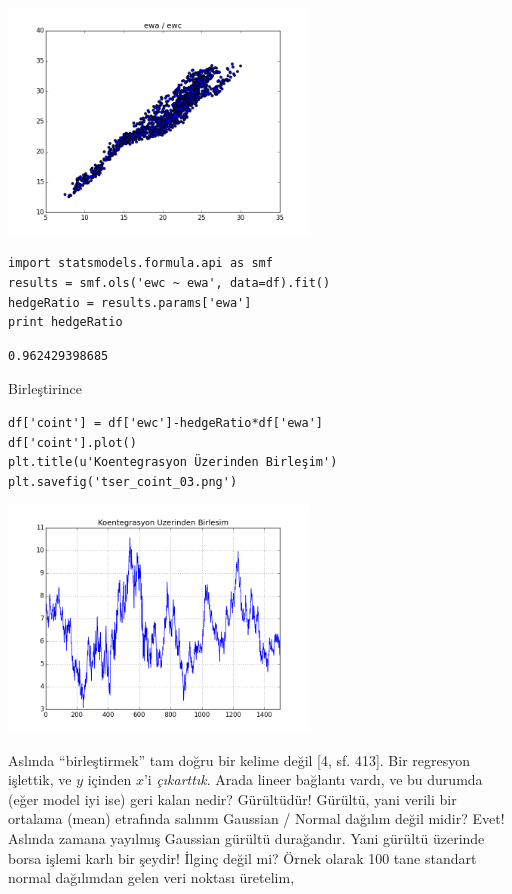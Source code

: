 \documentclass[12pt,fleqn]{article}\usepackage{../../common}
\begin{document}
\includegraphics[height=6cm]{tser_coint_02.png}

\begin{verbatim}
import statsmodels.formula.api as smf
results = smf.ols('ewc ~ ewa', data=df).fit()
hedgeRatio = results.params['ewa']
print hedgeRatio
\end{verbatim}

\begin{verbatim}
0.962429398685
\end{verbatim}

Birleştirince 

\begin{verbatim}
df['coint'] = df['ewc']-hedgeRatio*df['ewa']
df['coint'].plot()
plt.title(u'Koentegrasyon Üzerinden Birleşim')
plt.savefig('tser_coint_03.png')
\end{verbatim}

\includegraphics[height=6cm]{tser_coint_03.png}

Aslında ``birleştirmek'' tam doğru bir kelime değil [4, sf. 413]. Bir regresyon
işlettik, ve $y$ içinden $x$'i {\em çıkarttık}. Arada lineer bağlantı vardı, ve
bu durumda (eğer model iyi ise) geri kalan nedir? Gürültüdür!  Gürültü, yani
verili bir ortalama (mean) etrafında salınım Gaussian / Normal dağılım değil
midir?  Evet! Aslında zamana yayılmış Gaussian gürültü durağandır. Yani gürültü
üzerinde borsa işlemi karlı bir şeydir! İlginç değil mi? Örnek olarak 100 tane
standart normal dağılımdan gelen veri noktası üretelim,
\end{document}
